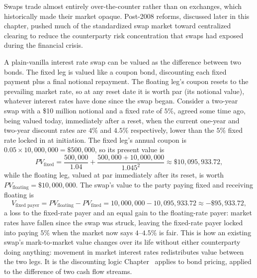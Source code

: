 \documentclass[../ai_in_finance]{subfiles}
\begin{document}
Swaps trade almost entirely over-the-counter rather than on exchanges, which historically made their market opaque. Post-2008 reforms, discussed later in this chapter, pushed much of the standardized swap market toward centralized clearing to reduce the counterparty risk concentration that swaps had exposed during the financial crisis.


A plain-vanilla interest rate swap can be valued as the difference between two bonds. The fixed leg is valued like a coupon bond, discounting each fixed payment plus a final notional repayment. The floating leg's coupon resets to the prevailing market rate, so at any reset date it is worth par (its notional value), whatever interest rates have done since the swap began. Consider a two-year swap with a \$10 million notional and a fixed rate of $5\%$, agreed some time ago, being valued today, immediately after a reset, when the current one-year and two-year discount rates are $4\%$ and $4.5\%$ respectively, lower than the $5\%$ fixed rate locked in at initiation. The fixed leg's annual coupon is $0.05 \times 10{,}000{,}000 = \$500{,}000$, so its present value is
\begin{equation*}
PV_{\text{fixed}} = \frac{500{,}000}{1.04} + \frac{500{,}000 + 10{,}000{,}000}{1.045^2} \approx \$10{,}095{,}933.72,
\end{equation*}
while the floating leg, valued at par immediately after its reset, is worth $PV_{\text{floating}} = \$10{,}000{,}000$. The swap's value to the party paying fixed and receiving floating is
\begin{equation*}
V_{\text{fixed payer}} = PV_{\text{floating}} - PV_{\text{fixed}} = 10{,}000{,}000 - 10{,}095{,}933.72 \approx -\$95{,}933.72,
\end{equation*}
a loss to the fixed-rate payer and an equal gain to the floating-rate payer: market rates have fallen since the swap was struck, leaving the fixed-rate payer locked into paying $5\%$ when the market now says $4$--$4.5\%$ is fair. This is how an existing swap's mark-to-market value changes over its life without either counterparty doing anything: movement in market interest rates redistributes value between the two legs. It is the discounting logic Chapter~ applies to bond pricing, applied to the difference of two cash flow streams.
\end{document}
